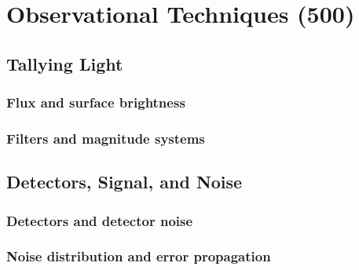 \chapter{Observational Techniques (500)}



\section{Tallying Light}
\subsection{Flux and surface brightness}

\subsection{Filters and magnitude systems}


\section{Detectors, Signal, and Noise}
\subsection{Detectors and detector noise}

\subsection{Noise distribution and error propagation}

